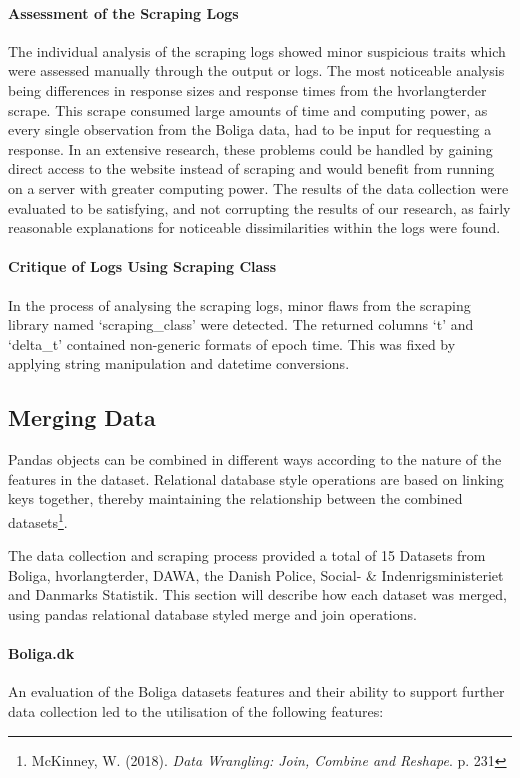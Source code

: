\documentclass[12pt,a4paper]{article}
\begin{document}
\paragraph{Assessment of the Scraping Logs\newline}
The individual analysis of the scraping logs showed minor suspicious traits which were assessed manually through the output or logs. The most noticeable analysis being differences in response sizes and response times from the hvorlangterder scrape. This scrape consumed large amounts of time and computing power, as every single observation from the Boliga data, had to be input for requesting a response. In an extensive research, these problems could be handled by gaining direct access to the website instead of scraping and would benefit from running on a server with greater computing power. The results of the data collection were evaluated to be satisfying, and not corrupting the results of our research, as fairly reasonable explanations for noticeable dissimilarities within the logs were found. 

\paragraph{Critique of Logs Using Scraping Class\newline}
In the process of analysing the scraping logs, minor flaws from the scraping library named ‘scraping\_class’ were detected. The returned columns ‘t’ and ‘delta\_t’ contained non-generic formats of epoch time. This was fixed by applying string manipulation and datetime conversions. 

\subsection{Merging Data}
Pandas objects can be combined in different ways according to the nature of the features in the dataset. Relational database style operations are based on linking keys together, thereby maintaining the relationship between the combined datasets\footnote{McKinney, W. (2018). \textit{Data Wrangling: Join, Combine and Reshape}. p. 231 }.

The data collection and scraping process provided a total of 15 Datasets from Boliga, hvorlangterder, DAWA, the Danish Police, Social- \& Indenrigsministeriet and Danmarks Statistik. This section will describe how each dataset was merged, using pandas relational database styled merge and join operations. 

\paragraph{Boliga.dk\newline}
An evaluation of the Boliga datasets features and their ability to support further data collection led to the utilisation of the following features: 
\end{document}
